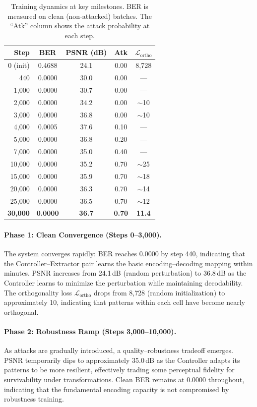 \documentclass[10pt, twocolumn]{article}
\newcommand{\Lcal}{\mathcal{L}}
\begin{document}
\begin{table}[t]
\centering
\caption{Training dynamics at key milestones. BER is measured on clean (non-attacked) batches. The ``Atk'' column shows the attack probability at each step.}
\label{tab:training_dynamics}
\small
\begin{tabular}{@{}rcccc@{}}
\toprule
\textbf{Step} & \textbf{BER} & \textbf{PSNR (dB)} & \textbf{Atk} & \textbf{$\Lcal_\text{ortho}$} \\
\midrule
0 (init)     & 0.4688 & 24.1 & 0.00 & 8{,}728 \\
440          & 0.0000 & 30.0 & 0.00 & --- \\
1{,}000      & 0.0000 & 30.7 & 0.00 & --- \\
2{,}000      & 0.0000 & 34.2 & 0.00 & $\sim$10 \\
3{,}000      & 0.0000 & 36.8 & 0.00 & $\sim$10 \\
4{,}000      & 0.0005 & 37.6 & 0.10 & --- \\
5{,}000      & 0.0000 & 36.8 & 0.20 & --- \\
7{,}000      & 0.0000 & 35.0 & 0.40 & --- \\
10{,}000     & 0.0000 & 35.2 & 0.70 & $\sim$25 \\
15{,}000     & 0.0000 & 35.9 & 0.70 & $\sim$18 \\
20{,}000     & 0.0000 & 36.3 & 0.70 & $\sim$14 \\
25{,}000     & 0.0000 & 36.5 & 0.70 & $\sim$12 \\
\textbf{30{,}000}     & \textbf{0.0000} & \textbf{36.7} & \textbf{0.70} & \textbf{11.4} \\
\bottomrule
\end{tabular}
\end{table}

\paragraph{Phase 1: Clean Convergence (Steps 0--3{,}000).}
The system converges rapidly: BER reaches 0.0000 by step 440, indicating that the Controller--Extractor pair learns the basic encoding--decoding mapping within minutes.
PSNR increases from 24.1\,dB (random perturbation) to 36.8\,dB as the Controller learns to minimize the perturbation while maintaining decodability.
The orthogonality loss $\Lcal_\text{ortho}$ drops from 8{,}728 (random initialization) to approximately 10, indicating that patterns within each cell have become nearly orthogonal.

\paragraph{Phase 2: Robustness Ramp (Steps 3{,}000--10{,}000).}
As attacks are gradually introduced, a quality--robustness tradeoff emerges.
PSNR temporarily dips to approximately 35.0\,dB as the Controller adapts its patterns to be more resilient, effectively trading some perceptual fidelity for survivability under transformations.
Clean BER remains at 0.0000 throughout, indicating that the fundamental encoding capacity is not compromised by robustness training.
\end{document}
